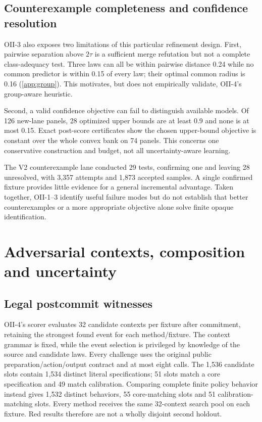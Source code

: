 

\subsection{Counterexample completeness and confidence resolution}\label{p3:c09}
OII-3 also exposes two limitations of this particular refinement design. First, pairwise separation above $2\tau$ is a sufficient merge refutation but not a complete class-adequacy test. Three laws can all be within pairwise distance 0.24 while no common predictor is within 0.15 of every law; their optimal common radius is 0.16 (\cref{app:group}). This motivates, but does not empirically validate, OII-4's group-aware heuristic.

Second, a valid confidence objective can fail to distinguish available models. Of 126 new-lane panels, 28 optimized upper bounds are at least 0.9 and none is at most 0.15. Exact post-score certificates show the chosen upper-bound objective is constant over the whole convex bank on 74 panels. This concerns one conservative construction and budget, not all uncertainty-aware learning.

The V2 counterexample lane conducted 29 tests, confirming one and leaving 28 unresolved, with 3,357 attempts and 1,873 accepted samples. A single confirmed fixture provides little evidence for a general incremental advantage. Taken together, OII-1--3 identify useful failure modes but do not establish that better counterexamples or a more appropriate objective alone solve finite opaque identification.



\section{Adversarial contexts, composition and uncertainty}\label{sec:adversarial}
\subsection{Legal postcommit witnesses}\label{p3:c15}
OII-4's scorer evaluates 32 candidate contexts per fixture after commitment, retaining the strongest found event for each method/fixture. The context grammar is fixed, while the event selection is privileged by knowledge of the source and candidate laws. Every challenge uses the original public preparation/action/output contract and at most eight calls. The 1,536 candidate slots contain 1,534 distinct literal specifications; 51 slots match a core specification and 49 match calibration. Comparing complete finite policy behavior instead gives 1,532 distinct behaviors, 55 core-matching slots and 51 calibration-matching slots. Every method receives the same 32-context search pool on each fixture. Red results therefore are not a wholly disjoint second holdout.

